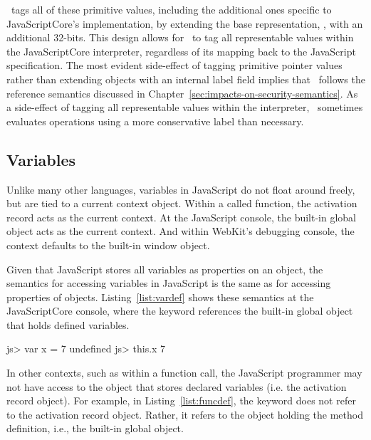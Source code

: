 \FlowCore\ tags all of these primitive values, including the additional ones specific to JavaScriptCore's implementation, by extending the base representation, , with an additional 32-bits.
This design allows for \FlowCore\ to tag all representable values within the JavaScriptCore interpreter, regardless of its mapping back to the JavaScript specification.
The most evident side-effect of tagging primitive pointer values rather than extending objects with an internal label field implies that \FlowCore\ follows the reference semantics discussed in Chapter~\ref{sec:impacts-on-security-semantics}.
As a side-effect of tagging all representable values within the interpreter, \FlowCore\ sometimes evaluates operations using a more conservative label than necessary.

\subsection{Variables}
\label{sec:variables}

Unlike many other languages, variables in JavaScript do not float around freely, but are tied to a current context object.
Within a called function, the activation record acts as the current context.
At the JavaScript console, the built-in global object acts as the current context.
And within WebKit's debugging console, the context defaults to the built-in window object.

Given that JavaScript stores all variables as properties on an object, the semantics for accessing variables in JavaScript is the same as for accessing properties of objects.
Listing~\ref{list:vardef} shows these semantics at the JavaScriptCore console, where the  keyword references the built-in global object that holds defined variables.

\begin{jscode}
js> var x = 7
undefined
js> this.x
7
\end{jscode}

In other contexts, such as within a function call, the JavaScript programmer may not have access to the object that stores declared variables (i.e. the activation record object).
For example, in Listing~\ref{list:funcdef}, the  keyword does not refer to the activation record object.
Rather, it refers to the object holding the method definition, i.e., the built-in global object.

